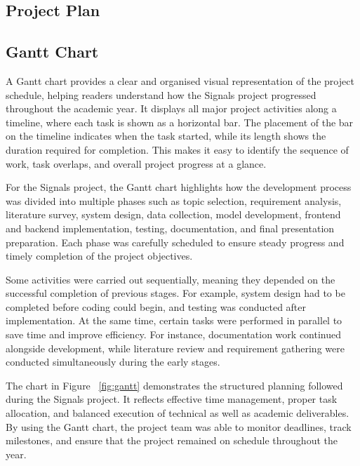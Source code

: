\documentclass[12pt,a4paper,oneside,openany]{book}
\begin{document}
\begin{itemize}[leftmargin=8mm]
\chapter{Project Plan}
\label{ch:plan}
\section{Gantt Chart}

A Gantt chart provides a clear and organised visual representation of the project schedule, helping readers understand how the Signals project progressed throughout the academic year. It displays all major project activities along a timeline, where each task is shown as a horizontal bar. The placement of the bar on the timeline indicates when the task started, while its length shows the duration required for completion. This makes it easy to identify the sequence of work, task overlaps, and overall project progress at a glance.

For the Signals project, the Gantt chart highlights how the development process was divided into multiple phases such as topic selection, requirement analysis, literature survey, system design, data collection, model development, frontend and backend implementation, testing, documentation, and final presentation preparation. Each phase was carefully scheduled to ensure steady progress and timely completion of the project objectives.

Some activities were carried out sequentially, meaning they depended on the successful completion of previous stages. For example, system design had to be completed before coding could begin, and testing was conducted after implementation. At the same time, certain tasks were performed in parallel to save time and improve efficiency. For instance, documentation work continued alongside development, while literature review and requirement gathering were conducted simultaneously during the early stages.

The chart in Figure ~\ref{fig:gantt} demonstrates the structured planning followed during the Signals project. It reflects effective time management, proper task allocation, and balanced execution of technical as well as academic deliverables. By using the Gantt chart, the project team was able to monitor deadlines, track milestones, and ensure that the project remained on schedule throughout the year.



\end{itemize}
\end{document}
